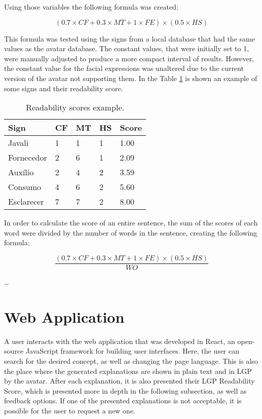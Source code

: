 Using those variables the following formula was created:

\begin{equation}
(0.7 \times CF + 0.3 \times MT + 1 \times FE) \times (0.5 \times HS)
\label{wordScore}
\end{equation}

This formula was tested using the signs from a local database that had the same values as the avatar database.
The constant values, that were initially set to 1, were manually adjusted to produce a more compact interval of results.
However, the constant value for the facial expressions was unaltered due to the current version of the avatar not supporting them.
In the Table \ref{table:signs} is shown an example of some signs and their readability score.

\begin{table}[H]
    \centering
    \caption{Readability scores example.}
    \label{table:signs}
    \begin{tabular}{l|l|l|l|l}
        {\bfseries Sign} & {\bfseries CF} & {\bfseries MT} & {\bfseries HS} & {\bfseries Score} \\
        \hline
        Javali & 1 & 1 & 1 & 1.00  \\
        \hline
        Fornecedor & 2 & 6 & 1 & 2.09  \\
        \hline
        Auxílio & 2 & 4 & 2 & 3.59 \\
        \hline
        Consumo & 4 & 6 & 2 & 5.60 \\
        \hline
        Esclarecer & 7 & 7 & 2 & 8.00 \\
    \end{tabular}
\end{table}

In order to calculate the score of an entire sentence, the sum of the scores of each word were divided by the number of words in the sentence, creating the following formula:

\begin{equation}
    \frac{(0.7 \times CF + 0.3 \times MT + 1 \times FE) \times (0.5 \times HS)}{WO}
\label{sentecneScore}
\end{equation}

\dots %

\section{Web Application}

A user interacts with the web application that was developed in React, an open-source JavaScript framework for building user interfaces.
Here, the user can search for the desired concept, as well as changing the page language.
This is also the place where the generated explanations are shown in plain text and in \gls{LGP} by the avatar.
After each explanation, it is also presented their \gls{LGP} Readability Score, which is presented more in depth in the following subsection, as well as feedback options.
If one of the presented explanations is not acceptable, it is possible for the user to request a new one.

